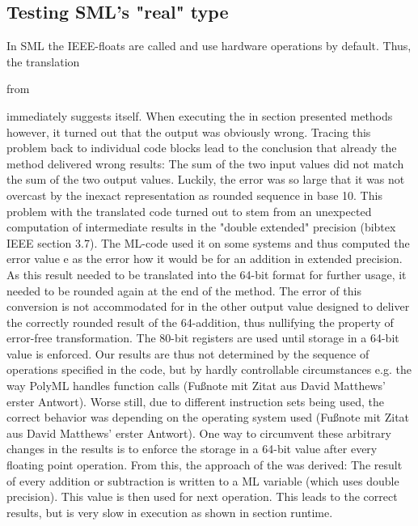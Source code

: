 \documentclass[11pt,a4paper]{article}
\begin{document}
\subsection{Testing SML's "real" type}

In SML the IEEE-floats are called
and use hardware operations by default. Thus, the translation

from
 
immediately suggests itself. When executing the in section     presented methods however, it turned out that the output was obviously wrong. Tracing this problem back to individual code blocks lead to the conclusion that already the
method delivered wrong results: The sum of the two input values did not match the sum of the two output values. Luckily, the error was so large that it was not overcast by the inexact representation as rounded sequence in base 10.
This problem with the translated code turned out to stem from an unexpected computation of intermediate results in the "double extended" precision (bibtex IEEE section 3.7). The ML-code used it on some systems and thus computed the error value e as the error how it would be for an addition in extended precision. As this result needed to be translated into the 64-bit format for further usage, it needed to be rounded again at the end of the method. The error of this conversion is not accommodated for in the other output value designed to deliver the correctly rounded result of the 64-addition, thus nullifying the property of error-free transformation. The 80-bit registers are used until storage in a 64-bit value is enforced. Our results are thus not determined by the sequence of operations specified in the code, but by hardly controllable circumstances e.g. the way PolyML handles function calls (Fußnote mit Zitat aus David Matthews' erster Antwort). Worse still, due to different instruction sets being used, the correct behavior was depending on the operating system used (Fußnote mit Zitat aus David Matthews' erster Antwort). One way to circumvent these arbitrary changes in the results is to enforce the storage in a 64-bit value after every floating point operation. From this, the approach of the
was derived: The result of every addition or subtraction is written to a ML variable (which uses double precision). This value is then used for next operation. This leads to the correct results, but is very slow in execution as shown in section runtime.
\end{document}
